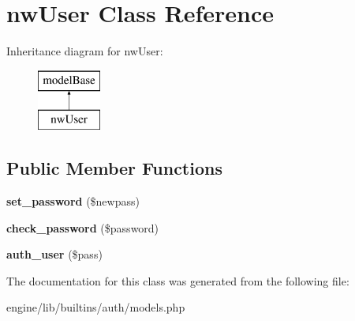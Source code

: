 \hypertarget{classnwUser}{\section{nw\-User Class Reference}
\label{classnwUser}
}
Inheritance diagram for nw\-User\-:\begin{figure}[H]
\begin{center}
\leavevmode
\includegraphics[height=2.000000cm]{classnwUser}
\end{center}
\end{figure}
\subsection*{Public Member Functions}
\begin{DoxyCompactItemize}
\item 
\hypertarget{classnwUser_a77d1c727701bbe971b1dfb8b8e0d7969}{{\bfseries set\-\_\-password} (\$newpass)}\label{classnwUser_a77d1c727701bbe971b1dfb8b8e0d7969}

\item 
\hypertarget{classnwUser_a72a9a2dff8b603498f59d4a29cf39547}{{\bfseries check\-\_\-password} (\$password)}\label{classnwUser_a72a9a2dff8b603498f59d4a29cf39547}

\item 
\hypertarget{classnwUser_a279737a0c576d840855c7d4249b0c904}{{\bfseries auth\-\_\-user} (\$pass)}\label{classnwUser_a279737a0c576d840855c7d4249b0c904}

\end{DoxyCompactItemize}


The documentation for this class was generated from the following file\-:\begin{DoxyCompactItemize}
\item 
engine/lib/builtins/auth/models.\-php\end{DoxyCompactItemize}
